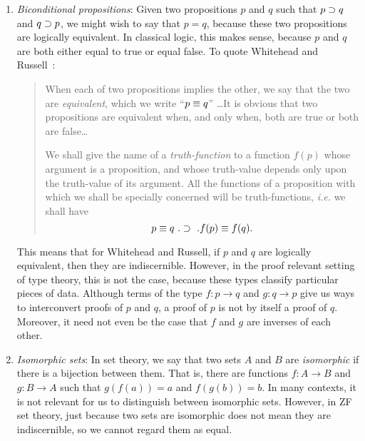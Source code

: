 \documentclass[12pt]{article}
\begin{document}
\begin{enumerate}

\item \emph{Biconditional propositions}: Given two propositions $p$ and $q$
such that $p \supset q$ and $q \supset p$, we might wish to say that $p = q$,
because these two propositions are logically equivalent. In classical logic,
this makes sense, because $p$ and $q$ are both either equal to true or equal
false. To quote Whitehead and Russell~\cite[p.115]{Whitehead63}:

\begin{quotation}

When each of two propositions implies the other, we say that the two are
\emph{equivalent}, which we write ``$p \equiv q$'' \dots It is obvious that two
propositions are equivalent when, and only when, both are true or both are
false\dots

We shall give the name of a \emph{truth-function} to a function
$f(p)$ whose argument is a proposition, and whose truth-value
depends only upon the truth-value of its argument. All the functions
of a proposition with which we shall be specially concerned will be
truth-functions, \emph{i.e.} we shall have
%
\begin{equation*}
p \equiv q \ . \supset \ . f(p) \equiv f(q) . 
\end{equation*}
%
\end{quotation}

This means that for Whitehead and Russell, if $p$ and $q$ are logically
equivalent, then they are indiscernible. However, in the proof relevant setting
of type theory, this is not the case, because these types classify particular
pieces of data.  Although terms of the type $f : p \to q$ and $g : q \to p$
give us ways to interconvert proofs of $p$ and $q$, a proof of $p$ is not by
itself a proof of $q$.  Moreover, it need not even be the case that $f$ and $g$
are inverses of each other.

\item \emph{Isomorphic sets}: In set theory, we say that two sets $A$ and $B$
are \emph{isomorphic} if there is a bijection between them. That is, there are
functions $f : A \to B$ and $g : B \to A$ such that $g(f(a)) = a$ and $f(g(b))
= b$. In many contexts, it is not relevant for us to distinguish between
isomorphic sets. However, in ZF set theory, just because two sets are
isomorphic does not mean they are indiscernible, so we cannot regard them
as equal.


\end{enumerate}
\end{document}
